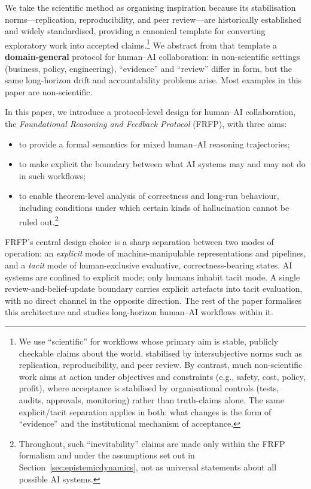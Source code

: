\documentclass[preprints,accept]{Definitions/mdpi}
\theoremstyle{definition}
\begin{document}
\smallskip
\noindent
We take the scientific method as organising inspiration because its stabilisation norms---replication, reproducibility, and peer review---are historically established and widely standardised, providing a canonical template for converting exploratory work into accepted claims.\footnote{We use ``scientific'' for workflows whose primary aim is stable, publicly checkable claims about the world, stabilised by intersubjective norms such as replication, reproducibility, and peer review. By contrast, much non-scientific work aims at action under objectives and constraints (e.g., safety, cost, policy, profit), where acceptance is stabilised by organisational controls (tests, audits, approvals, monitoring) rather than truth-claims alone. The same explicit/tacit separation applies in both: what changes is the form of ``evidence'' and the institutional mechanism of acceptance.}
We abstract from that template a \textbf{domain-general} protocol for human--AI collaboration: in non-scientific settings (business, policy, engineering), ``evidence'' and ``review'' differ in form, but the same long-horizon drift and accountability problems arise. Most examples in this paper are non-scientific.

\smallskip
\noindent
In this paper, we introduce a protocol-level design for human--AI collaboration, the \emph{Foundational Reasoning and Feedback Protocol} (FRFP), with three aims:
\begin{itemize}
  \item to provide a formal semantics for mixed human--AI reasoning trajectories;
  \item to make explicit the boundary between what AI systems may and may not do in such workflows;
  \item to enable theorem-level analysis of correctness and long-run behaviour, including conditions under which certain kinds of hallucination cannot be ruled out.\footnote{Throughout, such ``inevitability'' claims are made only within the FRFP formalism and under the assumptions set out in Section~\ref{sec:epistemicdynamics}, not as universal statements about all possible AI systems.}
\end{itemize}

\noindent
FRFP’s central design choice is a sharp separation between two modes of operation: an \emph{explicit} mode of machine-manipulable representations and pipelines, and a \emph{tacit} mode of human-exclusive evaluative, correctness-bearing states. AI systems are confined to explicit mode; only humans inhabit tacit mode. A single review-and-belief-update boundary carries explicit artefacts into tacit evaluation, with no direct channel in the opposite direction. The rest of the paper formalises this architecture and studies long-horizon human--AI workflows within it.
\end{document}
